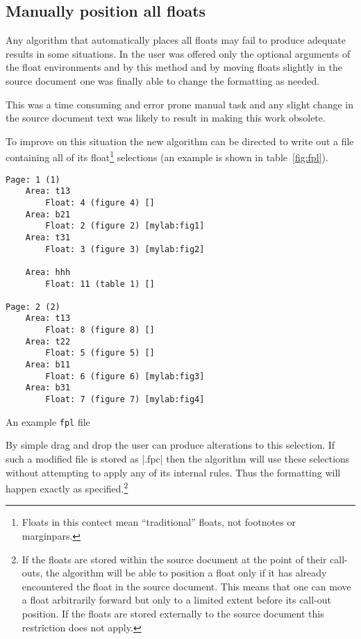\documentclass[twocolumn]{article}
\begin{document}
\subsection{Manually position all floats}

Any algorithm that automatically places all floats may fail to produce
adequate results in some situations. In \LaTeXe{} the user was offered
only the optional arguments of the float environments and by this
method and by moving floats slightly in the source document one was
finally able to change the formatting as needed.

This was a time consuming and error prone manual task and any slight
change in the source document text was likely to result in making this
work obsolete.

To improve on this situation the new algorithm can be directed to
write out a file containing all of its float\footnote{Floats in this
contect mean ``traditional'' floats, not footnotes or marginpars.}
selections (an example is
shown in table~\vref{fig:fpl}).
%
\begin{table}
\begin{minipage}{\columnwidth-24pt}
\footnotesize
\begin{verbatim}
Page: 1 (1)
    Area: t13
        Float: 4 (figure 4) []
    Area: b21
        Float: 2 (figure 2) [mylab:fig1]
    Area: t31
        Float: 3 (figure 3) [mylab:fig2]

    Area: hhh
        Float: 11 (table 1) []

Page: 2 (2)
    Area: t13
        Float: 8 (figure 8) []
    Area: t22
        Float: 5 (figure 5) []
    Area: b11
        Float: 6 (figure 6) [mylab:fig3]
    Area: b31
        Float: 7 (figure 7) [mylab:fig4]
\end{verbatim}
\end{minipage}
\caption{An example \texttt{fpl} file}\label{fig:fpl}
\end{table}
%
By simple drag and drop the user can produce alterations to this
selection. If such a modified file is stored as |\jobname.fpc| then
the algorithm will use these selections without attempting to apply
any of its internal rules. Thus the formatting will happen exactly as
specified.\footnote{If the floats are stored within the source
document at the point of their call-outs, the algorithm will be able
to position a float only if it has already encountered the float in the
source document. This means that one can move a float arbitrarily
forward but only to a limited extent before its call-out position. If
the floats are stored externally to the source document this
restriction does not apply.}
\end{document}
